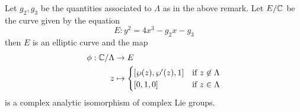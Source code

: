 \begin{theorem}
	\label{thm:lattice-curve}
	Let $g_2, g_3$ be the quantities associated to $\Lambda$ as in the above
	remark.
	Let $E/\mathbb{C}$ be the curve given by the equation
	\begin{equation*}
		E: y^2 = 4x^3 - g_2 x - g_3
	\end{equation*}
	then $E$ is an elliptic curve and the map
	\begin{align*}
		\phi: \mathbb{C}/\Lambda &\to E\\
		z &\mapsto 
		\begin{cases}
			[\wp(z), \wp'(z), 1] &\textrm{if } z \not\in \Lambda\\
			[0, 1, 0] &\textrm{if } z \in \Lambda
		\end{cases}
	\end{align*}
	is a complex analytic isomorphism of complex Lie groups.
\end{theorem}

